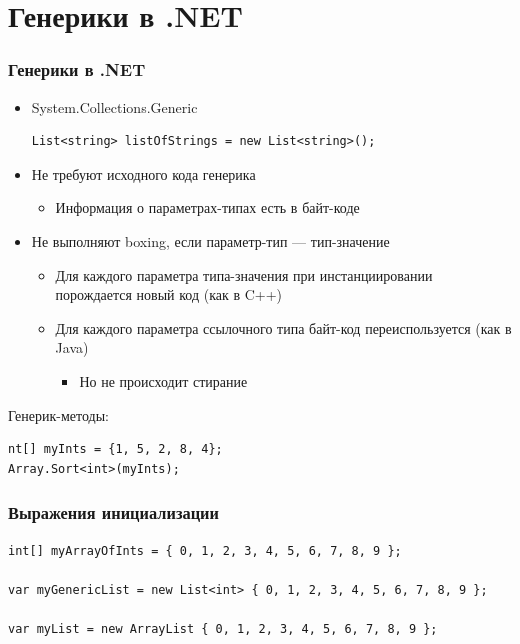\documentclass{../../slides-style}
\begin{document}
    \section{Генерики в .NET}

    \begin{frame}[fragile]
        \frametitle{Генерики в .NET}
        \begin{itemize}
            \item System.Collections.Generic
            \begin{verbatim}
List<string> listOfStrings = new List<string>();
            \end{verbatim}
            \item Не требуют исходного кода генерика
            \begin{itemize}
                \item Информация о параметрах-типах есть в байт-коде
            \end{itemize}
            \item Не выполняют boxing, если параметр-тип --- тип-значение
            \begin{itemize}
                \item Для каждого параметра типа-значения при инстанциировании порождается новый код (как в C++)
                \item Для каждого параметра ссылочного типа байт-код переиспользуется (как в Java)
                \begin{itemize}
                    \item Но не происходит стирание
                \end{itemize}
            \end{itemize}
        \end{itemize}

        Генерик-методы:
        \begin{verbatim}
nt[] myInts = {1, 5, 2, 8, 4};
Array.Sort<int>(myInts);
        \end{verbatim}
    \end{frame}

    \begin{frame}[fragile]
        \frametitle{Выражения инициализации}
        \begin{verbatim}
int[] myArrayOfInts = { 0, 1, 2, 3, 4, 5, 6, 7, 8, 9 };

var myGenericList = new List<int> { 0, 1, 2, 3, 4, 5, 6, 7, 8, 9 };

var myList = new ArrayList { 0, 1, 2, 3, 4, 5, 6, 7, 8, 9 };
        \end{verbatim}
    \end{frame}
\end{document}
